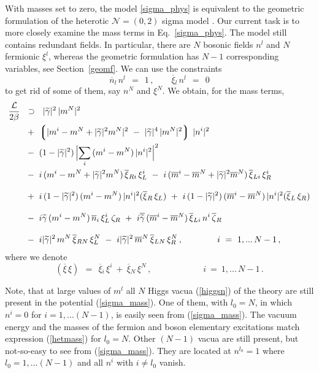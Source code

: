 \documentclass[12pt]{article}
\newcommand{\ntwoo}{${\mathcal N}= \left(0,2\right) $ }
\newcommand{\wt}{\widetilde}
\newcommand{\ov}{\overline}
\newcommand{\mc}[1]{\mathcal{#1}}
\newcommand{\lgr}{\left\lgroup}
\newcommand{\rgr}{\right\rgroup}
\newcommand{\bxir}{\ov{\xi}{}_R}
\newcommand{\bxil}{\ov{\xi}{}_L}
\newcommand{\xir}{\xi_R}
\newcommand{\xil}{\xi_L}
\newcommand{\bzr}{\ov{\zeta}{}_R}
\newcommand{\zr}{\zeta_R}
\newcommand{\tgamma}{\wt{\gamma}}
\begin{document}
	With masses set to zero, the model \eqref{sigma_phys} is equivalent to the 
	geometric formulation of the heterotic \ntwoo sigma model \cite{SYhet,BSYhet}.
Our current task is to more closely examine  the mass terms in Eq.~\eqref{sigma_phys}.
	The model still contains redundant fields.
	In particular, there are $N$ bosonic fields $n^l$ and $N$ fermionic $\xi^l$,
	whereas the geometric formulation has $N-1$ corresponding variables, see
	Section~\ref{geomf}.
	We can use the constraints
\[
	\ov{n}{}_l\, n^l ~~=~~ 1\,, \qquad \ov{\xi}{}_l\, n^l ~~=~~ 0
\]
	to get rid of some of them, say $ n^N $ and $ \xi^N $.
	We obtain, for the mass terms,
\begin{align}
%
\notag
	\frac{\mc{L}}{2\beta} & ~~\supset~~ 
	|\tgamma|^2\, |m^N|^2  
	\\
%
\notag
	&~
	~+~
	\lgr | m^i - m^N + |\tgamma|^2 m^N |^2 ~-~ |\tgamma|^4\, |m^N|^2 \rgr\, |n^i|^2 
	\\
%
\notag
	&~
	~-~ (1 - |\tgamma|^2)\, \Bigl|\sum_i\, (m^i - m^N)\,|n^i|^2 \Bigr|^2
	\\
%	
\label{sigma_mass}
	&~
	~-~ i\,(m^i - m^N + |\tgamma|^2 m^N )\,\ov{\xi}{}_{Ri}\,\xi_L^i
	~-~ i\,(\ov{m}{}^i - \ov{m}{}^N + |\tgamma|^2\ov{m}{}^N)\, \ov{\xi}{}_{Li}\, \xi_R^i 
	\\[3mm]
%
\notag
	&~
	~+~ i\,(1-|\tgamma|^2)\,(m^i - m^N)\,|n^i|^2(\bxir\,\xil) 
	~+~ i\,(1-|\tgamma|^2)\,(\ov{m}{}^i - \ov{m}{}^N)\,|n^i|^2(\bxil\,\xir)
	\\[3mm]
%
\notag
	&~
	~-~ i \tgamma\, (m^i - m^N)\, \ov{n}{}_i\, \xi_L^i\, \zr
	~+~ i \ov{\tgamma}\, (\ov{m}{}^i - \ov{m}{}^N)\, \ov{\xi}{}_{Li}\, n^i\, \bzr
	\\[3mm]
%
\notag
	&~
	~-~ i |\tgamma|^2\, m^N\, \ov{\xi}{}_{RN}\, \xi_L^N
	~-~ i |\tgamma|^2\, \ov{m}^N\, \ov{\xi}{}_{LN}\, \xi_R^N\,,
	\qquad\qquad
	i ~=~ 1,...\,N-1\,,
\end{align}
	where we denote
\[
	(\ov{\xi}\, \xi) ~~=~~ \ov{\xi}{}_i\, \xi^i  ~+~  \ov{\xi}{}_N\, \xi^N\,,
	\qquad\qquad\qquad
	i ~=~ 1,...\,N-1\,.
\]

\vspace{2mm}

Note, that at large values of $m^l$ all $N$ Higgs vacua (\ref{higgsn}) of the theory  are
still present in the potential (\ref{sigma_mass}).
One of them, with $l_0=N$, in which  $n^i=0$ for {$i=1,...(N-1)$},
is easily seen from (\ref{sigma_mass}). The vacuum energy and the
masses of the fermion and boson elementary excitations match
expression (\ref{hetmass}) for $l_0=N$. Other $(N-1)$
vacua are still present, but not-so-easy to see from (\ref{sigma_mass}).
They are located at $n^{l_0}=1$ where $l_0=1,...(N-1)$ and  all $  n^i$ with $i\neq l_0$
vanish.
\end{document}
